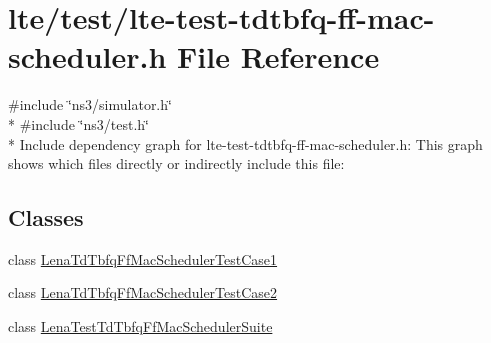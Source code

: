 \hypertarget{lte-test-tdtbfq-ff-mac-scheduler_8h}{}\section{lte/test/lte-\/test-\/tdtbfq-\/ff-\/mac-\/scheduler.h File Reference}
\label{lte-test-tdtbfq-ff-mac-scheduler_8h}
{\ttfamily \#include \char`\"{}ns3/simulator.\+h\char`\"{}}\\*
{\ttfamily \#include \char`\"{}ns3/test.\+h\char`\"{}}\\*
Include dependency graph for lte-\/test-\/tdtbfq-\/ff-\/mac-\/scheduler.h\+:
This graph shows which files directly or indirectly include this file\+:
\subsection*{Classes}
\begin{DoxyCompactItemize}
\item 
class \hyperlink{classLenaTdTbfqFfMacSchedulerTestCase1}{Lena\+Td\+Tbfq\+Ff\+Mac\+Scheduler\+Test\+Case1}
\item 
class \hyperlink{classLenaTdTbfqFfMacSchedulerTestCase2}{Lena\+Td\+Tbfq\+Ff\+Mac\+Scheduler\+Test\+Case2}
\item 
class \hyperlink{classLenaTestTdTbfqFfMacSchedulerSuite}{Lena\+Test\+Td\+Tbfq\+Ff\+Mac\+Scheduler\+Suite}
\end{DoxyCompactItemize}

